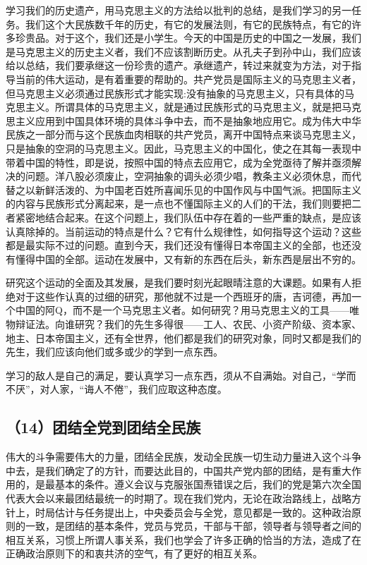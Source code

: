 学习我们的历史遗产，用马克思主义的方法给以批判的总结，是我们学习的另一任务。我们这个大民族数千年的历史，有它的发展法则，有它的民族特点，有它的许多珍贵品。对于这个，我们还是小学生。今天的中国是历史的中国之一发展，我们是马克思主义的历史主义者，我们不应该割断历史。从孔夫子到孙中山，我们应该给以总结，我们要承继这一份珍贵的遗产。承继遗产，转过来就变为方法，对于指导当前的伟大运动，是有着重要的帮助的。共产党员是国际主义的马克思主义者，但马克思主义必须通过民族形式才能实现:没有抽象的马克思主义，只有具体的马克思主义。所谓具体的马克思主义，就是通过民族形式的马克思主义，就是把马克思主义应用到中国具体环境的具体斗争中去，而不是抽象地应用它。成为伟大中华民族之一部分而与这个民族血肉相联的共产党员，离开中国特点来谈马克思主义，只是抽象的空洞的马克思主义。因此，马克思主义的中国化，使之在其每一表现中带着中国的特性，即是说，按照中国的特点去应用它，成为全党亟待了解并亟须解决的问题。洋八股必须废止，空洞抽象的调头必须少唱，教条主义必须休息，而代替之以新鲜活泼的、为中国老百姓所喜闻乐见的中国作风与中国气派。把国际主义的内容与民族形式分离起来，是一点也不懂国际主义的人们的干法，我们则要把二者紧密地结合起来。在这个问题上，我们队伍中存在着的一些严重的缺点，是应该认真除掉的。当前运动的特点是什么？它有什么规律性，如何指导这个运动？这些都是最实际不过的问题。直到今天，我们还没有懂得日本帝国主义的全部，也还没有懂得中国的全部。运动在发展中，又有新的东西在后头，新东西是层出不穷的。

研究这个运动的全面及其发展，是我们要时刻光起眼晴注意的大课题。如果有人拒绝对于这些作认真的过细的研究，那他就不过是一个西班牙的唐，吉诃德，再加一个中国的阿Q，而不是一个马克思主义者。如何研究？用马克思主义的工具——唯物辩证法。向谁研究？我们的先生多得很——工人、农民、小资产阶级、资本家、地主、日本帝国主义，还有全世界，他们都是我们的研究对象，同时又都是我们的先生，我们应该向他们或多或少的学到一点东西。

学习的敌人是自己的满足，要认真学习一点东西，须从不自满始。对自己，“学而不厌”，对人家，“诲人不倦”，我们应取这种态度。

\subsection{（14）团结全党到团结全民族}

伟大的斗争需要伟大的力量，团结全民族，发动全民族一切生动力量进入这个斗争中去，是我们确定了的方针，而要达此目的，中国共产党内部的团结，是有重大作用的，是最基本的条件。遵义会议与克服张国焘错误之后，我们的党是第六次全国代表大会以来最团结最统一的时期了。现在我们党内，无论在政治路线上，战略方针上，时局估计与任务提出上，中央委员会与全党，意见都是一致的。这种政治原则的一致，是团结的基本条件，党员与党员，干部与干部，领导者与领导者之间的相互关系，习惯上所谓人事关系，我们也学会了许多正确的恰当的方法，造成了在正确政治原则下的和衷共济的空气，有了更好的相互关系。

